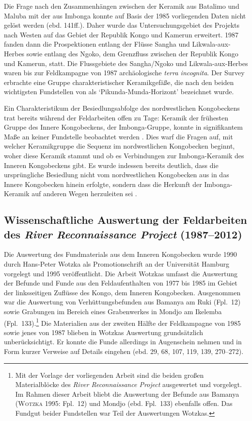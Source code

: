 Die Frage nach den Zusammenhängen zwischen der Keramik aus Batalimo und Maluba mit der aus Imbonga konnte auf Basis der 1985 vorliegenden Daten nicht gelöst werden (ebd. 141ff.). Daher wurde das Untersuchungsgebiet des Projekts nach Westen auf das Gebiet der Republik Kongo und Kamerun erweitert. 1987 fanden dann die Prospektionen entlang der Flüsse Sangha und Likwala-aux-Herbes sowie entlang des Ngoko, dem Grenzfluss zwischen der Republik Kongo und Kamerun, statt. Die Flussgebiete des Sangha/Ngoko und Likwala-aux-Herbes waren bis zur Feldkampagne von 1987 archäologische \textit{terra incognita}. Der Survey erbrachte eine Gruppe charakteristischer Keramikgefäße, die nach den beiden wichtigsten Fundstellen von \textcite[16f.]{Eggert.1992} als \enquote*{Pikunda-Munda-Horizont} bezeichnet wurde.

Ein Charakteristikum der Besiedlungsabfolge des nordwestlichen Kongobeckens trat bereits während der Feldarbeiten offen zu Tage: Keramik der frühesten Gruppe des Innere Kongobeckens, der Imbonga-Gruppe, konnte in signifikantem Maße an keiner Fundstelle beobachtet werden \parencite[4; siehe Kap.~\ref{sec:IMB-Gr}]{Eggert.1987c}. Dies warf die Fragen auf, mit welcher Keramikgruppe die Sequenz im nordwestlichen Kongobecken beginnt, woher diese Keramik stammt und ob es Verbindungen zur Imbonga-Keramik des Inneren Kongobeckens gibt. Es wurde indessen bereits deutlich, dass die ursprüngliche Besiedlung nicht vom nordwestlichen Kongobecken aus in das Innere Kongobecken hinein erfolgte, sondern dass die Herkunft der Imbonga-Keramik auf anderen Wegen herzuleiten sei \parencite[257 Anm.~49]{Wotzka.1995}.


\subsection*{Wissenschaftliche Auswertung der Feldarbeiten des \textit{River Reconnaissance Project} (1987--2012)}

Die Auswertung des Fundmaterials aus dem Inneren Kongobecken wurde 1990 durch Hans-Peter Wotzka als Promotionschrift an der Universität Hamburg vorgelegt und 1995 veröffentlicht. Die Arbeit Wotzkas umfasst die Auswertung der Befunde und Funde aus den Feldaufenthalten von 1977 bis 1985 im Gebiet der linksseitigen Zuflüsse des Kongo, dem Inneren Kongobecken. Ausgenommen war die Auswertung von Verhüttungsbefunden aus Bamanya am Ruki (Fpl.~12) sowie Grabungen im Bereich eines Grabenwerkes in Mondjo am Ikelemba (Fpl.~133).\footnote{Mit der Vorlage der vorliegenden Arbeit sind die beiden großen Materialblöcke des \textit{River Reconnaissance Project} ausgewertet und vorgelegt. Im Rahmen dieser Arbeit bliebt die Auswertung der Befunde aus Bamanya (\textsc{Wotzka} 1995: Fpl.~12) und Mondjo (ebd. Fpl.~133) ebenfalls offen. Das Fundgut beider Fundstellen war Teil der Auswertungen Wotzkas.} Die Materialien aus der zweiten Hälfte der Feldkampagne von 1985 sowie jenes von 1987 blieben in Wotzkas Auswertung grundsätzlich unberücksichtigt. Er konnte die Funde allerdings in Augenschein nehmen und in Form kurzer Verweise auf Details eingehen (ebd. 29, 68, 107, 119, 139, 270--272).


